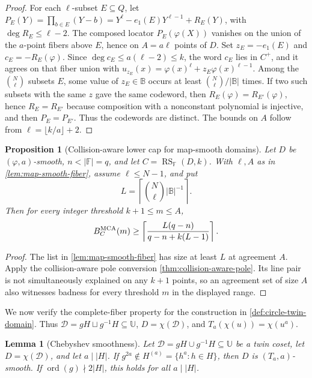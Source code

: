 \documentclass[11pt,a4paper]{amsart}
\numberwithin{equation}{section}
\newtheorem{proposition}[proposition]{Proposition}
\newtheorem{lemma}[lemma]{Lemma}
\theoremstyle{remark}
\DeclareMathOperator{\RS}{RS}
\DeclareMathOperator{\ord}{ord}
\newcommand{\F}{\mathbb F}
\newcommand{\B}{\mathbb B}
\newcommand{\Dcal}{\mathcal D}
\newcommand{\UU}{\mathbb U}
\newcommand{\abs}[1]{\lvert #1\rvert}
\begin{document}
\begin{proof}
For each \(\ell\)-subset \(E\subseteq Q\), let \(P_E(Y)=\prod_{b\in E}(Y-b)=Y^\ell-e_1(E)Y^{\ell-1}+R_E(Y)\), with \(\deg R_E\le\ell-2\).  The composed locator \(P_E(\varphi(X))\) vanishes on the union of the \(a\)-point fibers above \(E\), hence on \(A=a\ell\) points of \(D\).  Set \(z_E=-e_1(E)\) and \(c_E=-R_E(\varphi)\).  Since \(\deg c_E\le a(\ell-2)\le k\), the word \(c_E\) lies in \(C^+\), and it agrees on that fiber union with \(u_{z_E}(x)=\varphi(x)^\ell+z_E\varphi(x)^{\ell-1}\).  Among the \(\binom N\ell\) subsets \(E\), some value of \(z_E\in\B\) occurs at least \(\binom N\ell/\abs\B\) times.  If two such subsets with the same \(z\) gave the same codeword, then \(R_E(\varphi)=R_{E'}(\varphi)\), hence \(R_E=R_{E'}\) because composition with a nonconstant polynomial is injective, and then \(P_E=P_{E'}\).  Thus the codewords are distinct.  The bounds on \(A\) follow from \(\ell=\lfloor k/a\rfloor+2\).
\end{proof}

\begin{proposition}[Collision-aware lower cap for map-smooth domains]\label{prop:map-smooth-cap}
Let \(D\) be \((\varphi,a)\)-smooth, \(n<\abs\F=q\), and let
\(C=\RS_\F(D,k)\).  With \(\ell,A\) as in
\cref{lem:map-smooth-fiber}, assume \(\ell\le N-1\), and put
\[
 L=\left\lceil\binom N\ell\abs\B^{-1}\right\rceil.
\]
Then for every integer threshold \(k+1\le m\le A\),
\[
 B_C^{\rm MCA}(m)\ge
 \left\lceil\frac{L(q-n)}{q-n+k(L-1)}\right\rceil .
\]
\end{proposition}

\begin{proof}
The list in \cref{lem:map-smooth-fiber} has size at least \(L\) at
agreement \(A\).  Apply the collision-aware pole conversion
\cref{thm:collision-aware-pole}.  Its line pair is not simultaneously
explained on any \(k+1\) points, so an agreement set of size \(A\) also
witnesses badness for every threshold \(m\) in the displayed range.
\end{proof}

We now verify the complete-fiber property for the construction in
\cref{def:circle-twin-domain}.  Thus
\(\Dcal=gH\sqcup g^{-1}H\subseteq\UU\),
\(D=\chi(\Dcal)\), and \(T_a(\chi(u))=\chi(u^a)\).

\begin{lemma}[Chebyshev smoothness]\label{lem:cheb-smooth}
Let \(\Dcal=gH\cup g^{-1}H\subseteq\UU\) be a twin coset, let \(D=\chi(\Dcal)\), and let \(a\mid\abs H\).  If \(g^{2a}\notin H^{(a)}=\{h^a:h\in H\}\), then \(D\) is \((T_a,a)\)-smooth.  If \(\ord(g)\nmid2\abs H\), this holds for all \(a\mid\abs H\).
\end{lemma}
\end{document}
